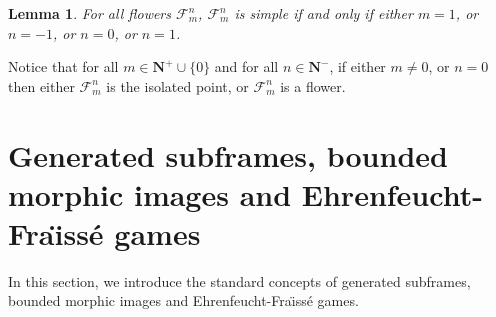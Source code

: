 \documentclass[draft]{article}
\newtheorem{lemma}{Lemma}
\begin{document}
%
%
%
%
%
%
%
%
%
%
\begin{lemma}\label{lemma:about:flowers:simple:galaxies}
%
%
For all flowers ${\mathcal F}_{m}^{n}$, ${\mathcal F}_{m}^{n}$ is simple if and only if either $m{=}1$, or $n{=}{-}1$, or $n{=}0$, or $n=1$.
%
%
\end{lemma}
%
%
Notice that for all $m{\in}\mathbf{N}^{+}{\cup}\{0\}$ and for all $n{\in}\mathbf{N}^{-}$, if either $m{\not=}0$, or $n{=}0$ then either ${\mathcal F}_{m}^{n}$ is the isolated point, or ${\mathcal F}_{m}^{n}$ is a flower.
%
%
%
%
\section{Generated subframes, bounded morphic images and Ehrenfeucht-Fra\"\i ss\'e games}
%
%
In this section, we introduce the standard concepts of generated subframes, bounded morphic images and Ehrenfeucht-Fra\"\i ss\'e games.
%
%
%
%
\end{document}
